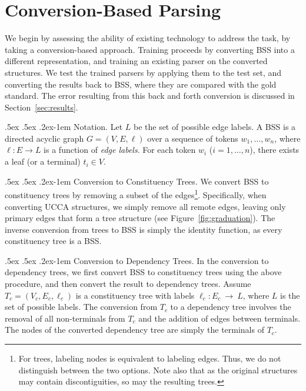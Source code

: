\documentclass[11pt]{article}
\makeatletter
\newcommand{\secref}[1]{Section~\ref{#1}}
\newcommand{\figref}[1]{Figure~\ref{#1}}
\renewcommand{\paragraph}{
  \@startsection{paragraph}{4}
  {\z@}{.5ex \@plus .5ex \@minus .2ex}{-1em}
  {\normalfont\normalsize\bfseries}
}
\makeatother
\begin{document}
\section{Conversion-Based Parsing}\label{sec:conversion_approach}

We begin by assessing the ability of existing technology to address the task,
by taking a conversion-based approach. Training proceeds by 
converting BSS into a different representation,
and training an existing parser on the converted structures.
We test the trained parsers by applying them to the test set,
and converting the results back to BSS, where they are compared
with the gold standard.
The error resulting from this back and forth conversion is discussed in
\secref{sec:results}.

\paragraph{Notation.}
Let $L$ be the set of possible edge labels.
A BSS is a directed acyclic graph $G=(V,E, \ell)$
over a sequence of tokens $w_1, \ldots, w_n$,
where $\ell:E\to L$ is a function of \textit{edge labels}.
For each token $w_i$ ($i=1, \ldots, n$), there exists a leaf (or a terminal) $t_i \in V$.

\paragraph{Conversion to Constituency Trees.}
We convert BSS to constituency trees by removing a subset of the
edges\footnote{For trees, labeling nodes is equivalent to labeling edges. Thus,
  we do not distinguish between the two options. 
  Note also that as the original structures may contain discontiguities, so may the resulting trees.}.
Specifically, when converting UCCA structures, we simply remove all remote edges,
leaving only primary edges that form a tree structure
(see \figref{fig:graduation}).
The inverse conversion from trees to BSS is simply the identity function, as every constituency tree is a BSS.

\paragraph{Conversion to Dependency Trees.}\label{subsec:con2dep}
In the conversion to dependency trees, we first convert BSS
to constituency trees using the above procedure, and then convert the result to dependency trees. 
Assume $T_c=(V_c,E_c,\ell_c)$ is a constituency tree with labels $\ell_c:E_c~\rightarrow~L$,
where $L$ is the set of possible labels.
The conversion from $T_c$ to a dependency tree involves the removal of
all non-terminals from $T_c$ and the addition of edges between terminals.
The nodes of the converted dependency tree are simply the terminals of $T_c$.
\end{document}
